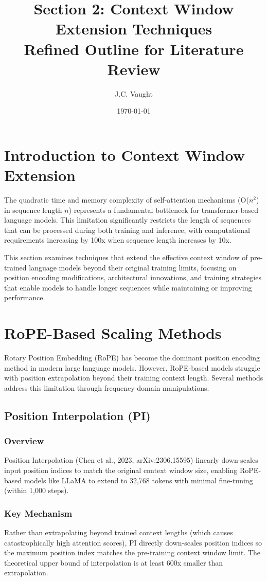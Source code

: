 \documentclass[11pt,letterpaper]{article}
\title{\textbf{\color{garnet}Section 2: Context Window Extension Techniques\\
\large Refined Outline for Literature Review}}
\author{J.C. Vaught}
\date{\today}
\begin{document}
\maketitle

\section{Introduction to Context Window Extension}

The quadratic time and memory complexity of self-attention mechanisms (O($n^2$) in sequence length $n$) represents a fundamental bottleneck for transformer-based language models. This limitation significantly restricts the length of sequences that can be processed during both training and inference, with computational requirements increasing by 100x when sequence length increases by 10x.

This section examines techniques that extend the effective context window of pre-trained language models beyond their original training limits, focusing on position encoding modifications, architectural innovations, and training strategies that enable models to handle longer sequences while maintaining or improving performance.

\section{RoPE-Based Scaling Methods}

Rotary Position Embedding (RoPE) has become the dominant position encoding method in modern large language models. However, RoPE-based models struggle with position extrapolation beyond their training context length. Several methods address this limitation through frequency-domain manipulations.

\subsection{Position Interpolation (PI)}

\subsubsection{Overview}
Position Interpolation (Chen et al., 2023, arXiv:2306.15595) linearly down-scales input position indices to match the original context window size, enabling RoPE-based models like LLaMA to extend to 32,768 tokens with minimal fine-tuning (within 1,000 steps).

\subsubsection{Key Mechanism}
Rather than extrapolating beyond trained context lengths (which causes catastrophically high attention scores), PI directly down-scales position indices so the maximum position index matches the pre-training context window limit. The theoretical upper bound of interpolation is at least 600x smaller than extrapolation.
\end{document}
